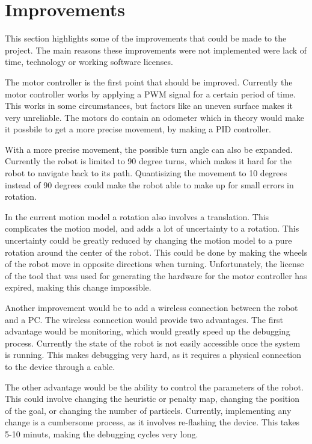 \documentclass[Main]{subfiles}
\begin{document}
\section{Improvements} %
	\label{sec:improvements}

	This section highlights some of the improvements that could be made to the project.
	The main reasons these improvements were not implemented were lack of time, technology or working software licenses.
	
	The motor controller is the first point that should be improved.
	Currently the motor controller works by applying a PWM signal for a certain period of time.
	This works in some circumstances, but factors like an uneven surface makes it very unreliable.
	The motors do contain an odometer which in theory would make it possbile to get a more precise movement, by making a PID controller.
	
	With a more precise movement, the possible turn angle can also be expanded.
	Currently the robot is limited to 90 degree turns, which makes it hard for the robot to navigate back to its path.
	Quantisizing the movement to 10 degrees instead of 90 degrees could make the robot able to make up for small errors in rotation.
	
	In the current motion model a rotation also involves a translation.
	This complicates the motion model, and adds a lot of uncertainty to a rotation.
	This uncertainty could be greatly reduced by changing the motion model to  a pure rotation around the center of the robot.
	This could be done by making the wheels of the robot move in opposite directions when turning.
	Unfortunately, the license of the tool that was used for generating the hardware for the motor controller has expired, making this change impossible.
	
	Another improvement would be to add a wireless connection between the robot and a PC.
	The wireless connection would provide two advantages.
	The first advantage would be monitoring, which would greatly speed up the debugging process.
	Currently the state of the robot is not easily accessible once the system is running.
	This makes debugging very hard, as it requires a physical connection to the device through a cable.
	
	The other advantage would be the ability to control the parameters of the robot. 
	This could involve changing the heuristic or penalty map, changing the position of the goal, or changing the number of particels.
	Currently, implementing any change is a cumbersome process, as it involves re-flashing the device. 
	This takes 5-10 minuts, making the debugging cycles very long.
	
\end{document}
